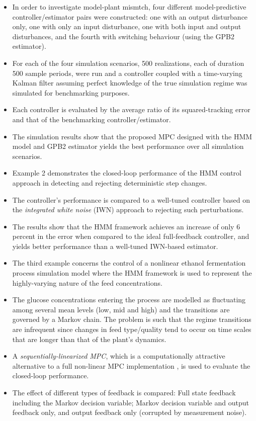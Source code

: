 \begin{itemize}
	\item In order to investigate model-plant mismtch, four different model-predictive controller/estimator pairs were constructed: one with an output disturbance only, one with only an input disturbance, one with both input and output disturbances, and the fourth with switching behaviour (using the GPB2 estimator).
	\item For each of the four simulation scenarios, 500 realizations, each of duration 500 sample periods, were run and a controller coupled with a time-varying Kalman filter assuming perfect knowledge of the true simulation regime was simulated for benchmarking purposes.
	\item Each controller is evaluated by the average ratio of its squared-tracking error and that of the benchmarking controller/estimator.
	\item The simulation results show that the proposed MPC designed with the HMM model and GPB2 estimator yields the best performance over all simulation scenarios.
	\item Example 2 demonstrates the closed-loop performance of the HMM control approach in detecting and rejecting deterministic step changes.
	\item The controller's performance is compared to a well-tuned controller based on the \textit{integrated white noise} (IWN) approach to rejecting such perturbations.
	\item The results show that the HMM framework achieves an increase of only 6 percent in the error when compared to the ideal full-feedback controller, and yields better performance than a well-tuned IWN-based estimator.
	\item The third example concerns the control of a nonlinear ethanol fermentation process simulation model where the HMM framework is used to represent the highly-varying nature of the feed concentrations.
	\item The glucose concentrations entering the process are modelled as fluctuating among several mean levels (low, mid and high) and the transitions are governed by a Markov chain.  The problem is such that the regime transitions are infrequent since changes in feed type/quality tend to occur on time scales that are longer than that of the plant’s dynamics.
	\item A \textit{sequentially-linearized MPC}, which is a computationally attractive alternative to a full non-linear MPC implementation \cite{lee_extended_1994}, is used to evaluate the closed-loop performance.
	\item The effect of different types of feedback is compared: Full state feedback including the Markov decision variable; Markov decision variable and output feedback only, and output feedback only (corrupted by measurement noise).

\end{itemize}
